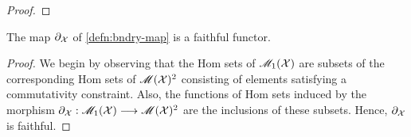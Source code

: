 \documentclass[11pt]{amsart}
\begin{document}
\begin{proof}
%
\end{proof}

\begin{prop}\label{prop:bndry-map-fully-faithful}
The map $\partial_\mathcal{X}$ of \cref{defn:bndry-map} is a faithful functor.
\end{prop}
\begin{proof}
We begin by observing that the Hom sets of $\mathscr{M}_1(\mathcal{X})$ are subsets
of the corresponding Hom sets of $\mathscr{M}(\mathcal{X})^2$ consisting of elements
satisfying a commutativity constraint. Also, the functions of Hom sets induced
by the morphism $\partial_\mcX : \sM_1(\mcX) \to \sM(\mcX)^2$ are the
inclusions of these subsets. Hence, $\partial_\mathcal{X}$ is faithful.
\end{proof}
\end{document}
